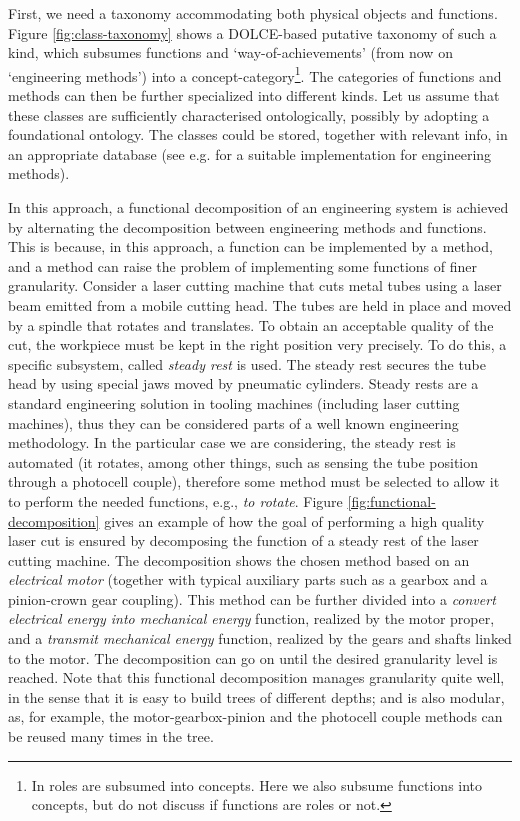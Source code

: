 \documentclass[
]{ceurart}
\begin{document}
First, we need a taxonomy accommodating both physical objects and functions. Figure \ref{fig:class-taxonomy} shows a DOLCE-based \cite{Borgo-FGG22Dolce} putative taxonomy of such a kind, which subsumes functions and `way-of-achievements' (from now on `engineering methods') into a concept-category\footnote{In \cite{Borgo-FGG22Dolce} roles are subsumed into concepts. Here we also subsume functions into concepts, but do not discuss if functions are roles or not.}. 
The categories of functions and methods can then be further specialized into different kinds. 
Let us assume that these classes are sufficiently characterised ontologically, possibly by adopting a foundational ontology. 
The classes could be stored, together with relevant info, in an appropriate database (see e.g. \cite{kitamuraOntologybasedDescriptionFunctional2003} for a suitable implementation for engineering methods).

In this approach, a functional decomposition of an engineering system is achieved by alternating the decomposition between engineering methods and functions. This is because, in this approach, a function can be implemented by a method, and a method can raise the problem of implementing some functions of finer granularity. 
Consider a laser cutting machine that cuts metal tubes using a laser beam emitted from a mobile cutting head. The tubes are held in place and moved by a spindle that rotates and translates. To obtain an acceptable quality of the cut, the workpiece must be kept in the right position very precisely. To do this, a specific subsystem, called \textit{steady rest} is used. The steady rest secures the tube head by using special jaws moved by pneumatic cylinders. 
Steady rests are a standard engineering solution in tooling machines (including laser cutting machines), thus they can be considered parts of a well known engineering methodology. In the particular case we are considering, the steady rest is automated (it rotates, among other things, such as sensing the tube position through a photocell couple), therefore some method must be selected to allow it to perform the needed functions, e.g., \textit{to rotate}. Figure \ref{fig:functional-decomposition} gives an example of how the goal of performing a high quality laser cut is ensured by decomposing the function of a steady rest of the laser cutting machine.
The decomposition shows the chosen method based on an \textit{electrical motor} (together with typical auxiliary parts such as a gearbox and a pinion-crown gear coupling). This method can be further divided into a \textit{convert electrical energy into mechanical energy} function, realized by the motor proper, and a \textit{transmit mechanical energy} function, realized by the gears and shafts linked to the motor. The decomposition can go on until the desired granularity level is reached. 
Note that this functional decomposition manages granularity quite well, in the sense that it is easy to build trees of different depths; and is also modular, as, for example, the motor-gearbox-pinion and the photocell couple methods can be reused many times in the tree.
\end{document}
